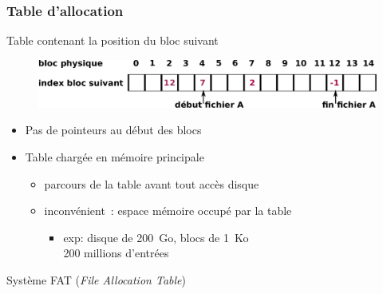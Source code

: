 \begin{frame}
  \frametitle{Table d'allocation}
  Table contenant la position du bloc suivant
  \begin{figure}
    \includegraphics[width=\linewidth]{fig4/table_alloc}
  \end{figure}
\begin{itemize}
\item Pas de pointeurs au début des blocs
\item Table chargée en mémoire principale
  \begin{itemize}
  \item parcours de la table avant tout accès disque  
  \item inconvénient~: espace mémoire occupé par la table
    \begin{itemize}
    \item exp: disque de 200~Go, blocs de 1~Ko\\
      \hspace{0.7cm}  200 millions d'entrées
    \end{itemize}
  \end{itemize}
\end{itemize}
 Système \alert{FAT} (\emph{File Allocation Table})  
\end{frame}

